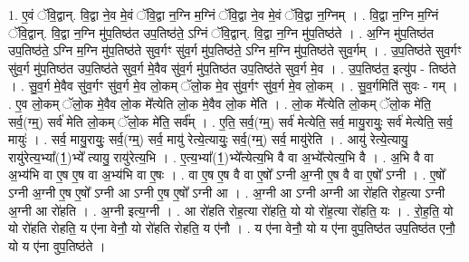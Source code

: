 \documentclass[17pt]{extarticle}
\begin{document}
1. ए॒वं ॅवि॒द्वान्. वि॒द्वा ने॒व मे॒वं ॅवि॒द्वा न॒ग्नि म॒ग्निं ॅवि॒द्वा ने॒व मे॒वं ॅवि॒द्वा न॒ग्निम् । . वि॒द्वा न॒ग्नि म॒ग्निं ॅवि॒द्वान्. वि॒द्वा न॒ग्नि मु॑प॒तिष्ठ॑त उप॒तिष्ठ॑ते॒ ऽग्निं ॅवि॒द्वान्. वि॒द्वा न॒ग्नि मु॑प॒तिष्ठ॑ते । . अ॒ग्नि मु॑प॒तिष्ठ॑त उप॒तिष्ठ॑ते॒ ऽग्नि म॒ग्नि मु॑प॒तिष्ठ॑ते सुव॒र्गꣳ सु॑व॒र्ग मु॑प॒तिष्ठ॑ते॒ ऽग्नि म॒ग्नि मु॑प॒तिष्ठ॑ते सुव॒र्गम् । . उ॒प॒तिष्ठ॑ते सुव॒र्गꣳ सु॑व॒र्ग मु॑प॒तिष्ठ॑त उप॒तिष्ठ॑ते सुव॒र्ग मे॒वैव सु॑व॒र्ग मु॑प॒तिष्ठ॑त उप॒तिष्ठ॑ते सुव॒र्ग मे॒व । . उ॒प॒तिष्ठ॑त॒ इत्यु॑प - तिष्ठ॑ते । . सु॒व॒र्ग मे॒वैव सु॑व॒र्गꣳ सु॑व॒र्ग मे॒व लो॒कम् ॅलो॒क मे॒व सु॑व॒र्गꣳ सु॑व॒र्ग मे॒व लो॒कम् । . सु॒व॒र्गमिति॑ सुवः - गम् । . ए॒व लो॒कम् ॅलो॒क मे॒वैव लो॒क मे᳚त्येति लो॒क मे॒वैव लो॒क मे॑ति । . लो॒क मे᳚त्येति लो॒कम् ॅलो॒क मे॑ति॒ सर्व॒(ग्म्॒) सर्व॑ मेति लो॒कम् ॅलो॒क मे॑ति॒ सर्व᳚म् । . ए॒ति॒ सर्व॒(ग्म्॒) सर्व॑ मेत्येति॒ सर्व॒ मायु॒रायुः॒ सर्व॑ मेत्येति॒ सर्व॒ मायुः॑ । . सर्व॒ मायु॒रायुः॒ सर्व॒(ग्म्॒) सर्व॒ मायु॑ रेत्ये॒त्यायुः॒ सर्व॒(ग्म्॒) सर्व॒ मायु॑रेति । . आयु॑ रेत्ये॒त्यायु॒ रायु॑रेत्य॒भ्या᳚(1॒)भ्ये᳚ त्यायु॒ रायु॑रेत्य॒भि । . ए॒त्य॒भ्या᳚(1॒)भ्ये᳚त्येत्य॒भि वै वा अ॒भ्ये᳚त्येत्य॒भि वै । . अ॒भि वै वा अ॒भ्य॑भि वा ए॒ष ए॒ष वा अ॒भ्य॑भि वा ए॒षः । . वा ए॒ष ए॒ष वै वा ए॒षो᳚ ऽग्नी अ॒ग्नी ए॒ष वै वा ए॒षो᳚ ऽग्नी । . ए॒षो᳚ ऽग्नी अ॒ग्नी ए॒ष ए॒षो᳚ ऽग्नी आ ऽग्नी ए॒ष ए॒षो᳚ ऽग्नी आ । . अ॒ग्नी आ ऽग्नी अग्नी आ रो॑हति रोह॒त्या ऽग्नी अ॒ग्नी आ रो॑हति । . अ॒ग्नी इत्य॒ग्नी । . आ रो॑हति रोह॒त्या रो॑हति॒ यो यो रो॑ह॒त्या रो॑हति॒ यः । . रो॒ह॒ति॒ यो यो रो॑हति रोहति॒ य ए॑ना वेनौ॒ यो रो॑हति रोहति॒ य ए॑नौ । . य ए॑ना वेनौ॒ यो य ए॑ना वुप॒तिष्ठ॑त उप॒तिष्ठ॑त एनौ॒ यो य ए॑ना वुप॒तिष्ठ॑ते । \newline
\end{document}
